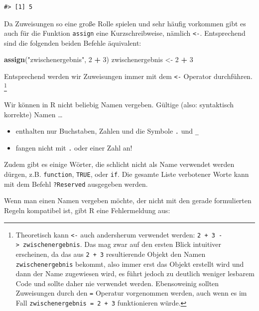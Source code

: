 \documentclass[]{book}
\newenvironment{Shaded}{\begin{snugshade}}{\end{snugshade}}
\newcommand{\KeywordTok}[1]{\textcolor[rgb]{0.13,0.29,0.53}{\textbf{#1}}}
\newcommand{\DecValTok}[1]{\textcolor[rgb]{0.00,0.00,0.81}{#1}}
\newcommand{\StringTok}[1]{\textcolor[rgb]{0.31,0.60,0.02}{#1}}
\newcommand{\OperatorTok}[1]{\textcolor[rgb]{0.81,0.36,0.00}{\textbf{#1}}}
\newcommand{\NormalTok}[1]{#1}
\providecommand{\tightlist}{%
  \setlength{\itemsep}{0pt}\setlength{\parskip}{0pt}}
\let\rmarkdownfootnote\footnote%
\def\footnote{\protect\rmarkdownfootnote}
\begin{document}
\begin{verbatim}
#> [1] 5
\end{verbatim}

Da Zuweisungen so eine große Rolle spielen und sehr häufig vorkommen
gibt es auch für die Funktion \texttt{assign} eine Kurzschreibweise,
nämlich \texttt{\textless{}-}. Entsprechend sind die folgenden beiden
Befehle äquivalent:

\begin{Shaded}
\begin{Highlighting}[]
\KeywordTok{assign}\NormalTok{(}\StringTok{"zwischenergebnis"}\NormalTok{, }\DecValTok{2} \OperatorTok{+}\StringTok{ }\DecValTok{3}\NormalTok{)}
\NormalTok{zwischenergebnis <-}\StringTok{ }\DecValTok{2} \OperatorTok{+}\StringTok{ }\DecValTok{3}
\end{Highlighting}
\end{Shaded}

Entsprechend werden wir Zuweisungen immer mit dem \texttt{\textless{}-}
Operator durchführen. \footnote{Theoretisch kann \texttt{\textless{}-}
  auch andersherum verwendet werden:
  \texttt{2\ +\ 3\ -\textgreater{}\ zwischenergebnis}. Das mag zwar auf
  den ersten Blick intuitiver erscheinen, da das aus \texttt{2\ +\ 3}
  resultierende Objekt den Namen \texttt{zwischenergebnis} bekommt, also
  immer erst das Objekt erstellt wird und dann der Name zugewiesen wird,
  es führt jedoch zu deutlich weniger lesbarem Code und sollte daher nie
  verwendet werden. Ebensoweinig sollten Zuweisungen durch den
  \texttt{=} Operatur vorgenommen werden, auch wenn es im Fall
  \texttt{zwischenergebnis\ =\ 2\ +\ 3} funktionieren würde.}

Wir können in R nicht beliebig Namen vergeben. Gültige (also:
syntaktisch korrekte) Namen \ldots{}

\begin{itemize}
\tightlist
\item
  enthalten nur Buchstaben, Zahlen und die Symbole \texttt{.} und
  \texttt{\_}
\item
  fangen nicht mit \texttt{.} oder einer Zahl an!
\end{itemize}

Zudem gibt es einige Wörter, die schlicht nicht als Name verwendet
werden dürgen, z.B. \texttt{function}, \texttt{TRUE}, oder \texttt{if}.
Die gesamte Liste verbotener Worte kann mit dem Befehl
\texttt{?Reserved} ausgegeben werden.

Wenn man einen Namen vergeben möchte, der nicht mit den gerade
formulierten Regeln kompatibel ist, gibt R eine Fehlermeldung aus:
\end{document}
